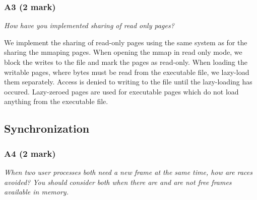 \documentclass{report}
\newcommand{\question}[1]{\textit{#1} \ }
\begin{document}
			\subsubsection*{A3 (2 mark)}
				\question{How have you implemented sharing of read only pages?}
				
				We implement the sharing of read-only pages using the same 
				system as for the sharing the mmaping pages.
				When opening the mmap in read only mode, we block the writes to the 
				file and mark the pages as read-only.
				When loading the writable pages, where bytes must be read from 
				the executable file, we lazy-load them separately. Access is 
				denied to writing to the file until the lazy-loading has occured.
				Lazy-zeroed pages are used for executable pages which do not 
				load anything from the executable file.
			
		\subsection*{Synchronization}
			\subsubsection*{A4 (2 mark)}
				\question{When two user processes both need a new frame at 
				the same time, how are races avoided? You should consider both 
				when there are and are not free frames available in memory.}
				
\end{document}
